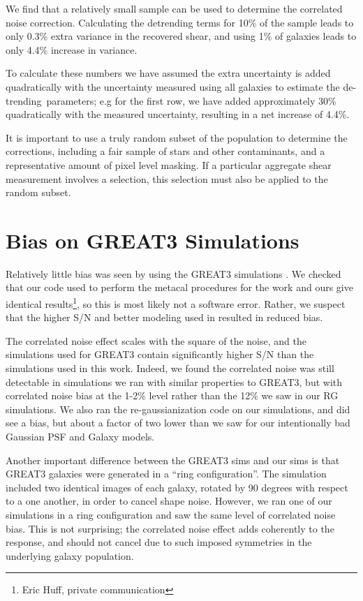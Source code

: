 \documentclass[usegraphicx,usenatbib]{mn2e}
\newcommand{\detrend}{de-trending}
\begin{document}
We find that a relatively small sample can be used to determine the correlated
noise correction.  Calculating the detrending terms for 10\% of the sample
leads to only 0.3\% extra variance in the recovered shear, and using 1\% of
galaxies leads to only 4.4\% increase in variance.

To calculate these numbers we have assumed the extra uncertainty is added
quadratically with the uncertainty measured using all galaxies to estimate the
\detrend\ parameters; e.g for the first row, we have added approximately 30\%
quadratically with the measured uncertainty, resulting in a net increase of
4.4\%.

It is important to use a truly random subset of the population to determine the
corrections, including a fair sample of stars and other contaminants, and a
representative amount of pixel level masking.  If a particular aggregate shear
measurement involves a selection, this selection must also be applied to the
random subset.

\section{Bias on GREAT3 Simulations}

Relatively little bias was seen by \cite{HuffMcal} using the GREAT3
simulations \citep{great3}.  We checked that our code used to perform
the metacal procedures for the \cite{HuffMcal} work and ours give identical
results\footnote{Eric Huff, private communication}, so this is most likely not
a software error.  Rather, we suspect that the higher S/N and better modeling
used in \cite{HuffMcal} resulted in reduced bias.

The correlated noise effect scales with the square of the noise, and the
simulations used for GREAT3 contain significantly higher S/N than the
simulations used in this work.  Indeed, we found the correlated noise was still
detectable in simulations we ran with similar properties to GREAT3, but with
correlated noise bias at the 1-2\% level rather than the 12\% we saw in our RG
simulations.  We also ran the re-gaussianization code on our simulations, and
did see a bias, but about a factor of two lower than we saw for our
intentionally bad Gaussian PSF and Galaxy models.

Another important difference between the GREAT3 sims and our sims is that
GREAT3 galaxies were generated in a ``ring configuration''.  The simulation
included two identical images of each galaxy, rotated by 90 degrees with
respect to a one another, in order to cancel shape noise.  However, we ran one
of our simulations in a ring configuration and saw the same level of correlated
noise bias.  This is not surprising; the correlated noise effect adds coherently
to the response, and should not cancel due to such imposed symmetries in the
underlying galaxy population.
\end{document}
